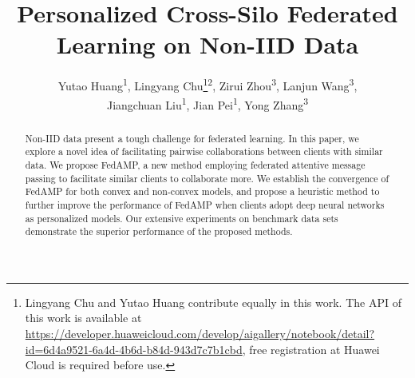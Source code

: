 \documentclass[letterpaper]{article} %
\title{Personalized Cross-Silo Federated Learning on Non-IID Data}
\author{Yutao Huang\textsuperscript{\rm 1}, Lingyang Chu\thanks{Lingyang Chu and Yutao Huang contribute equally in this work. The API of this work is available at \protect\url{https://developer.huaweicloud.com/develop/aigallery/notebook/detail?id=6d4a9521-6a4d-4b6d-b84d-943d7c7b1cbd}, free registration at Huawei Cloud is required before use.}\textsuperscript{\rm 2}, Zirui Zhou\textsuperscript{\rm 3}, Lanjun Wang\textsuperscript{\rm 3}, \\
Jiangchuan Liu\textsuperscript{\rm 1}, Jian Pei\textsuperscript{\rm 1}, Yong Zhang\textsuperscript{\rm 3}
}
\newcommand{\nop}[1]{}
\begin{document}
\maketitle

\nop{For the challenging computational environment of IOT/edge computing, personalized federated learning allows every client to train a strong personalized cloud model by effectively collaborating with the other clients in a privacy-preserving manner.}

\begin{abstract}

Non-IID data present a tough challenge for federated learning. In this paper, we explore a novel idea of facilitating pairwise collaborations between clients with similar data. We propose FedAMP, a new method employing federated attentive message passing to facilitate similar clients to collaborate more. We establish the convergence of FedAMP for both convex and non-convex models, and propose a heuristic method to further improve the performance of FedAMP when clients adopt deep neural networks as personalized models. Our extensive experiments on benchmark data sets demonstrate the superior performance of the proposed methods.

\nop{
Personalized cross-silo federated learning has raised a lot of interest from companies and institutes who want to participate as clients to collaboratively train strong personalized machine learning models without exposing their sensitive private data.
The performance of personalized cross-silo federated learning is largely determined by the effectiveness of inter-client collaboration.
However, when the data is non-IID across all clients, it is challenging to model the pair-wise collaboration relationships between clients without knowing their private data.
In this paper, we propose to tackle this problem by a novel framework named federated attentive message passing (FedAMP).
The key idea is to realize an attentive collaboration mechanism that adaptively discovers the underlying pair-wise collaboration relationships between clients by iteratively encouraging similar clients to collaborate more with each other.
We establish the convergence of FedAMP for both convex and non-convex models, and propose a heuristic method to further improve the performance of FedAMP when clients adopt deep neural networks as personalized models. Extensive experiments demonstrate the superior performance of the proposed methods.
}
\end{abstract}
\end{document}
